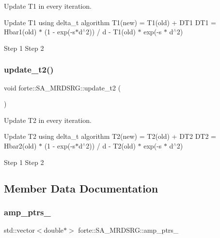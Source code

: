 Update T1 in every iteration. 

Update T1 using delta\+\_\+t algorithm T1(new) = T1(old) + D\+T1 D\+T1 = Hbar1(old) $\ast$ (1 -\/ exp(-\/s$\ast$d$^\wedge$2)) / d -\/ T1(old) $\ast$ exp(-\/s $\ast$ d$^\wedge$2) 

 Step 1 Step 2\mbox{\label{classforte_1_1_s_a___m_r_d_s_r_g_ae2f0d959eec8e5b74a1610e30541a3e6}} 
\subsubsection{\texorpdfstring{update\+\_\+t2()}{update\_t2()}}
{\footnotesize\ttfamily void forte\+::\+S\+A\+\_\+\+M\+R\+D\+S\+R\+G\+::update\+\_\+t2 (\begin{DoxyParamCaption}{ }\end{DoxyParamCaption})\hspace{0.3cm}{\ttfamily [protected]}}



Update T2 in every iteration. 

Update T2 using delta\+\_\+t algorithm T2(new) = T2(old) + D\+T2 D\+T2 = Hbar2(old) $\ast$ (1 -\/ exp(-\/s$\ast$d$^\wedge$2)) / d -\/ T2(old) $\ast$ exp(-\/s $\ast$ d$^\wedge$2) 

 Step 1 Step 2

\subsection{Member Data Documentation}
\mbox{\label{classforte_1_1_s_a___m_r_d_s_r_g_a6ea6eddb9570bc1f728ee185843281b1}} 
\subsubsection{\texorpdfstring{amp\+\_\+ptrs\+\_\+}{amp\_ptrs\_}}
{\footnotesize\ttfamily std\+::vector$<$double$\ast$$>$ forte\+::\+S\+A\+\_\+\+M\+R\+D\+S\+R\+G\+::amp\+\_\+ptrs\+\_\+\hspace{0.3cm}{\ttfamily [protected]}}



